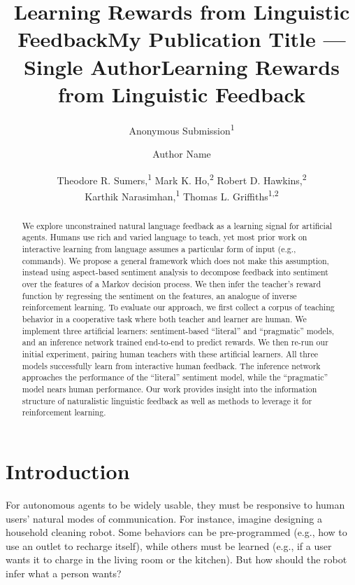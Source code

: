 \documentclass[letterpaper]{article} %
\title{Learning Rewards from Linguistic Feedback}
\author{
Anonymous Submission\textsuperscript{\rm 1}\\
}
\title{My Publication Title --- Single Author}
\author {
Author Name \\
}
\title{Learning Rewards from Linguistic Feedback}
\author {
Theodore R. Sumers,\textsuperscript{\rm 1}
Mark K. Ho,\textsuperscript{\rm 2}
Robert D. Hawkins,\textsuperscript{\rm 2}\\
Karthik Narasimhan,\textsuperscript{\rm 1}
Thomas L. Griffiths\textsuperscript{\rm 1,2}\\
}
\begin{document}
\maketitle

\begin{abstract}

We explore unconstrained natural language feedback as a learning signal for artificial agents. Humans use rich and varied language to teach, yet most prior work on interactive learning from language assumes a particular form of input (e.g., commands). We propose a general framework which does not make this assumption, instead using aspect-based sentiment analysis to decompose feedback into sentiment over the features of a Markov decision process. We then infer the teacher's reward function by regressing the sentiment on the features, an analogue of inverse reinforcement learning. To evaluate our approach, we first collect a corpus of teaching behavior in a cooperative task where both teacher and learner are human. We implement three artificial learners: sentiment-based ``literal'' and ``pragmatic'' models, and an inference network trained end-to-end to predict rewards. We then re-run our initial experiment, pairing human teachers with these artificial learners. All three models successfully learn from interactive human feedback. The inference network approaches the performance of the ``literal'' sentiment model, while the ``pragmatic'' model nears human performance. Our work provides insight into the information structure of naturalistic linguistic feedback as well as methods to leverage it for reinforcement learning.

\end{abstract}

\section{Introduction}
For autonomous agents to be widely usable, they must be responsive to human users' natural modes of communication. For instance, imagine designing a household cleaning robot. Some behaviors can be pre-programmed (e.g., how to use an outlet to recharge itself), while others must be learned (e.g., if a user wants it to charge in the living room or the kitchen). But how should the robot infer what a person wants?
\end{document}
